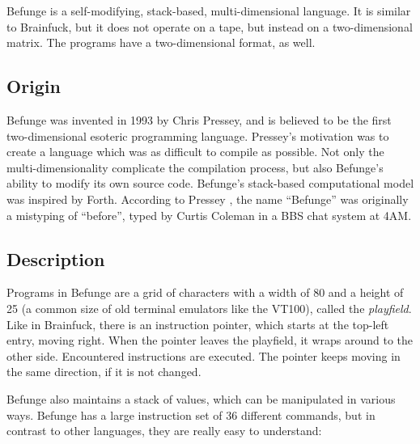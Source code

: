 Befunge is a self-modifying, stack-based, multi-dimensional language. It is similar to Brainfuck, but it does not operate on a tape, but instead on a two-dimensional matrix. The programs have a two-dimensional format, as well.

\subsection{Origin}

Befunge was invented in 1993 by Chris Pressey, and is believed to be the first two-dimensional esoteric programming language. Pressey's motivation was to create a language which was as difficult to compile as possible. Not only the multi-dimensionality complicate the compilation process, but also Befunge's ability to modify its own source code. Befunge's stack-based computational model was inspired by Forth. According to Pressey \cite{pressey_coleman}, the name “Befunge” was originally a mistyping of “before”, typed by Curtis Coleman in a BBS chat system at 4AM.

\subsection{Description}

Programs in Befunge are a grid of \ascii{} characters with a width of 80 and a height of 25 (a common size of old terminal emulators like the VT100), called the \emph{playfield}. Like in Brainfuck, there is an instruction pointer, which starts at the top-left entry, moving right. When the pointer leaves the playfield, it wraps around to the other side. Encountered instructions are executed. The pointer keeps moving in the same direction, if it is not changed.

Befunge also maintains a stack of values, which can be manipulated in various ways. Befunge has a large instruction set of 36 different commands, but in contrast to other languages, they are really easy to understand:

